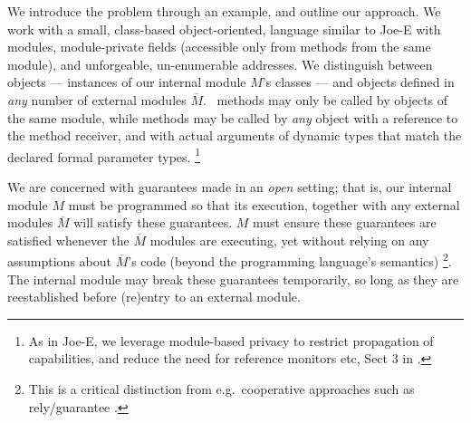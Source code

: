 \newcommand{\pwd}{key}

\renewcommand{\password}{key\xspace}

We introduce the problem  through an example, and outline our
approach.  We work with a  small, class-based object-oriented,  language similar to Joe-E \cite{JoeE} with modules,   module-private fields
({accessible} only from   methods {from} the same module),
and unforgeable, un-enumerable addresses.
We distinguish between  \emph{\internalO}
objects --- instances of our internal module $M$'s classes ---
and \emph{\externalO} objects defined in
\emph{any} number of external modules $\overline M$.~ 
{ methods  {may only be} called by objects of the same
  module,  while   methods  may be called by \emph{any}
  object with a reference to the method receiver, {and with
  actual arguments of  dynamic types that match} the declared formal parameter types.} 
\footnote{As in Joe-E, we leverage  module-based privacy to restrict propagation of capabilities, and reduce the need for reference monitors etc, \cf Sect 3 in  \cite{JoeE}.}   

 \label{s:concepts}

We are concerned with guarantees made in an \emph{open} setting; that
is, our internal module
$M$ must be programmed so that 
its execution, together with any external modules $\overline M$
will satisfy these guarantees.
$M$ must ensure these guarantees are satisfied
whenever the
$\overline M$  \emph{\externalM} modules are executing,
yet without relying on any assumptions about $\overline M$'s code
(beyond the programming language's semantics)%
\footnote{
This is a critical distinction from e.g.\
cooperative approaches such as rely/guarantee
\cite{relyGuarantee-HayesJones-setss2017,relyGuarantee-vanStaden-mpc2015}.}.
The internal module may break these guarantees temporarily,
so long as they {are reestablished} before (re)entry to an external module.
 

 
